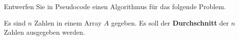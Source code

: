 %
%
Entwerfen Sie in Pseudocode einen Algorithmus für das folgende Problem.

\begin{problem}\label{problem-durchschnitt-n-zahlen}
Es sind $n$ Zahlen in einem Array $A$ gegeben. Es soll der \textbf{Durchschnitt} der $n$ Zahlen ausgegeben werden.
\end{problem}

\fillwithgrid	{3.5in}
